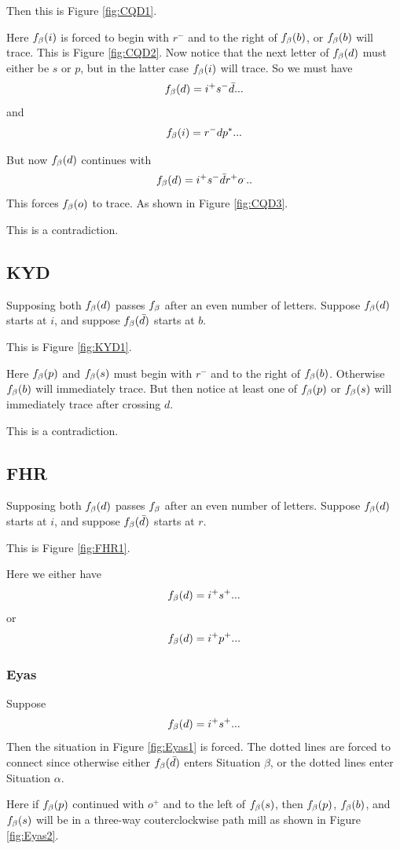 Then this is Figure \ref{fig:CQD1}.

Here $f_\beta(i)$ is forced to begin with $r^-$ and to the right of $f_\beta(b)$, or $f_\beta(b)$ will trace. This is Figure \ref{fig:CQD2}. Now notice that the next letter of $f_\beta(d)$ must either be $s$ or $p$, but in the latter case $f_\beta(i)$ will trace. So we must have
\[
f_\beta(d) = i^+ s^- \bar{d}...
\]
and
\[
f_\beta(i) = r^- d p^*...
\]

But now $f_\beta(d)$ continues with
\[
f_\beta(d) = i^+ s^- \bar{d} r^+ o^...
\]
This forces $f_\beta(o)$ to trace. As shown in Figure \ref{fig:CQD3}.

This is a contradiction.

\subsection{KYD}\label{KYD}
Supposing both $f_\beta(d)$ passes $f_\beta$ after an even number of letters. Suppose $f_\beta(d)$ starts at $i$, and suppose $f_\beta(\bar{d})$ starts at $b$.

This is Figure \ref{fig:KYD1}.

Here $f_\beta(p)$ and $f_\beta(s)$ must begin with $r^-$ and to the right of $f_\beta(b)$. Otherwise $f_\beta(b)$ will immediately trace. But then notice at least one of $f_\beta(p)$ or $f_\beta(s)$ will immediately trace after crossing $d$.

This is a contradiction.

\subsection{FHR}\label{FHR}
Supposing both $f_\beta(d)$ passes $f_\beta$ after an even number of letters. Suppose $f_\beta(d)$ starts at $i$, and suppose $f_\beta(\bar{d})$ starts at $r$. 

This is Figure \ref{fig:FHR1}.

Here we either have
\[
f_\beta(d) = i^+ s^+...
\]
or 
\[
f_\beta(d) = i^+ p^+...
\]

\subsubsection{Eyas}\label{Eyas}
Suppose
\[
f_\beta(d) = i^+ s^+...
\]
Then the situation in Figure \ref{fig:Eyas1} is forced. The dotted lines are forced to connect since otherwise either $f_\beta(\bar{d})$ enters Situation $\beta$, or the dotted lines enter Situation $\alpha$.

Here if $f_\beta(p)$ continued with $o^+$ and to the left of $f_\beta(s)$, then $f_\beta(p)$, $f_\beta(b)$, and $f_\beta(s)$ will be in a three-way couterclockwise path mill as shown in Figure \ref{fig:Eyas2}.


